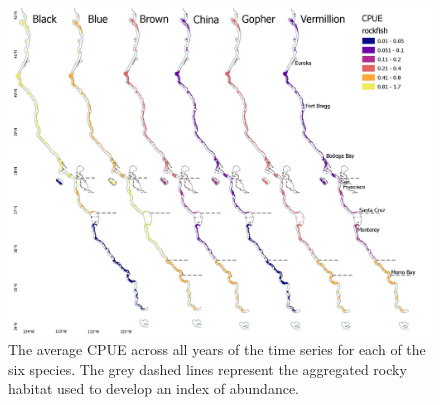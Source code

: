 \documentclass[
  authoryear,
  preprint,
  3p]{elsarticle}
\begin{document}
\begin{figure}

{\centering \includegraphics{figures/CPUE_map.jpg}

}

\caption{The average CPUE across all years of the time series for each
of the six species. The grey dashed lines represent the aggregated rocky
habitat used to develop an index of abundance.}

\end{figure}
\end{document}
